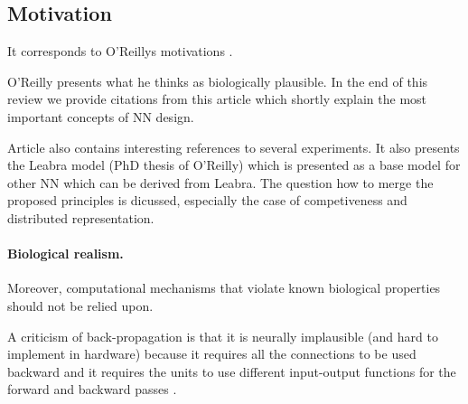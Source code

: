 




\subsection*{Motivation}

It corresponds to O'Reillys motivations \cite{o1998six}.

O'Reilly presents what he thinks as biologically plausible. In the end of this review we provide citations from this article which shortly explain the most important concepts of NN design. 

Article also contains interesting references to several experiments. It also presents the Leabra model (PhD thesis of O'Reilly) which is presented as a base model for other NN which can be derived from Leabra. The question how to merge the proposed principles is dicussed, especially the case of competiveness and distributed representation. 

\paragraph{Biological realism.} Moreover, computational mechanisms that violate
known biological properties should not be relied upon. 

A criticism of back-propagation is that it is neurally implausible (and hard to implement in hardware) because it requires all the connections to be used backward and it requires the units to use different input-output functions for the forward and backward passes \cite{hinton1988learning}.

